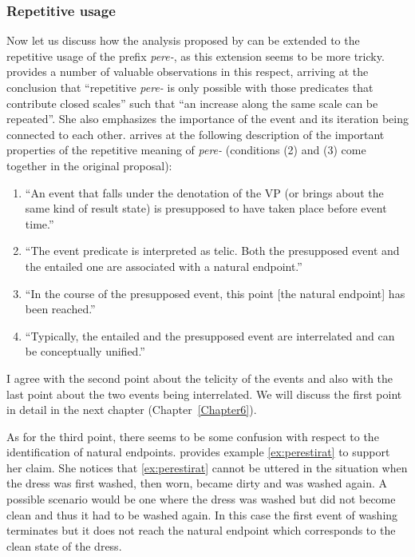 \subsubsection{Repetitive usage}
Now let us discuss how the analysis proposed by \citet{Kagan:book} can be extended to the repetitive usage of the prefix \textit{pere-}, as this extension seems to be more tricky. \citet[149]{Kagan:book} provides a number of valuable observations in this respect, arriving at the conclusion that ``repetitive \textit{pere-} is only possible with those predicates that contribute closed scales''
such that ``an increase along the same scale can be repeated''. She also emphasizes the importance of the event and its iteration being connected to each other. \citet[148]{Kagan:book} arrives at the following description of the important properties of the repetitive meaning of \textit{pere-} (conditions (2) and (3) come together in the original proposal): 
\begin{enumerate}
\item ``An event that falls under the denotation of the VP (or brings about the same kind of result state) is presupposed to have taken place before event time.'' 
\item ``The event predicate is interpreted as telic. Both the presupposed event and the entailed one are associated with a natural endpoint.'' 
\item ``In the course of the presupposed event, this point [the natural endpoint] has been reached.''
\item ``Typically, the entailed and the presupposed event are interrelated and can be conceptually unified.''
\end{enumerate}

I agree with the second point about the telicity of the events and also with the last point about the two events being interrelated. We will discuss the first point in detail in the next chapter (Chapter~\ref{Chapter6}). 

As for the third point, there seems to be some confusion with respect to the identification of natural endpoints. \citet{Kagan:book} provides example \ref{ex:perestirat} to support her claim. She notices that \ref{ex:perestirat} cannot be uttered in the situation when the dress was first washed, then worn, became dirty and was washed again. A possible scenario would be one where the dress was washed but did not become clean and thus it had to be washed again. In this case the first event of washing terminates but it does not reach the natural endpoint which corresponds to the clean state of the dress.

